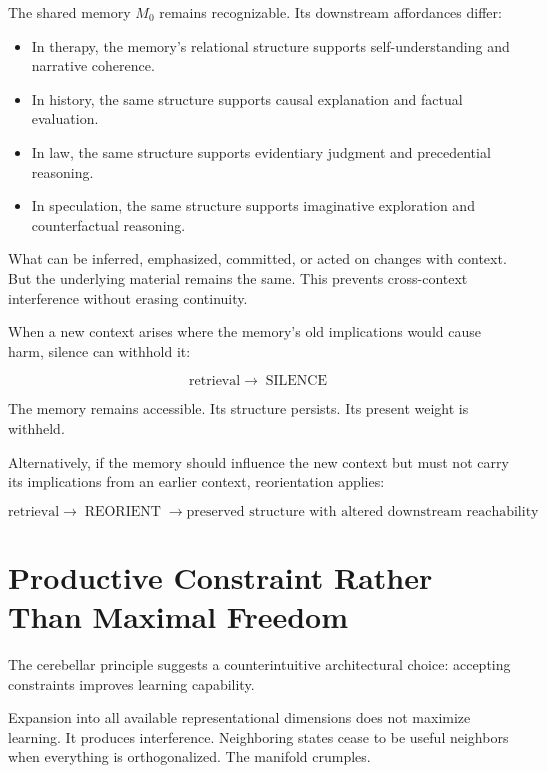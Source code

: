 \documentclass[12pt]{article}
\begin{document}
The shared memory $M_0$ remains recognizable. Its downstream affordances differ:

\begin{itemize}
\item In therapy, the memory's relational structure supports self-understanding and narrative coherence.
\item In history, the same structure supports causal explanation and factual evaluation.
\item In law, the same structure supports evidentiary judgment and precedential reasoning.
\item In speculation, the same structure supports imaginative exploration and counterfactual reasoning.
\end{itemize}

What can be inferred, emphasized, committed, or acted on changes with context. But the underlying material remains the same. This prevents cross-context interference without erasing continuity.

When a new context arises where the memory's old implications would cause harm, silence can withhold it:

\begin{equation}
\text{retrieval} \rightarrow \operatorname{SILENCE}
\end{equation}

The memory remains accessible. Its structure persists. Its present weight is withheld.

Alternatively, if the memory should influence the new context but must not carry its implications from an earlier context, reorientation applies:

\begin{equation}
\text{retrieval} \rightarrow \operatorname{REORIENT} \rightarrow \text{preserved structure with altered downstream reachability}
\end{equation}

\section{Productive Constraint Rather Than Maximal Freedom}

The cerebellar principle suggests a counterintuitive architectural choice: accepting constraints improves learning capability.

Expansion into all available representational dimensions does not maximize learning. It produces interference. Neighboring states cease to be useful neighbors when everything is orthogonalized. The manifold crumples.
\end{document}
